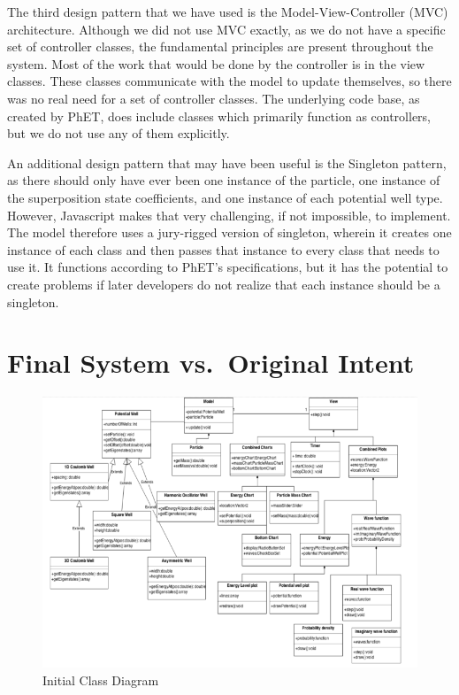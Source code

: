 The third design pattern that we have used is the Model-View-Controller (MVC) architecture. Although
we did not use MVC exactly, as we do not have a specific set of controller classes, the fundamental
principles are present throughout the system. Most of the work that would be done by the controller
is in the view classes. These classes communicate with the model to update themselves, so there was
no real need for a set of controller classes.  The underlying code base, as created by PhET, does
include classes which primarily function as controllers, but we do not use any of them explicitly.

An additional design pattern that may have been useful is the Singleton pattern, as there should
only have ever been one instance of the particle, one instance of the superposition state
coefficients, and one instance of each potential well type.  However, Javascript makes that very
challenging, if not impossible, to implement.  The model therefore uses a jury-rigged version of
singleton, wherein it creates one instance of each class and then passes that instance to every
class that needs to use it.  It functions according to PhET's specifications, but it has the
potential to create problems if later developers do not realize that each instance should be a
singleton.

\section{Final System vs.\ Original Intent}

\begin{figure}[H]
    \centering
    \includegraphics[width=\textwidth]{./img/initialclassdiagram.png}
    \caption{Initial Class Diagram}
\end{figure}

